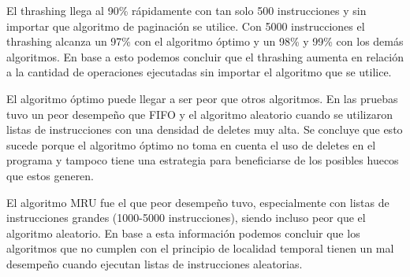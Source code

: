 \documentclass{report}
\begin{document}
El thrashing llega al 90\% rápidamente con tan solo 500 instrucciones y sin importar que algoritmo de paginación se utilice.  Con 5000 instrucciones el thrashing alcanza un 97\% con el algoritmo óptimo y un 98\% y 99\% con los demás algoritmos. En base a esto podemos concluir que el thrashing aumenta en relación a la cantidad de operaciones ejecutadas sin importar el algoritmo que se utilice.

El algoritmo óptimo puede llegar a ser peor que otros algoritmos. En las pruebas tuvo un peor desempeño que FIFO y el algoritmo aleatorio cuando se utilizaron listas de instrucciones con una densidad de deletes muy alta. Se concluye que esto sucede porque el algoritmo óptimo no toma en cuenta el uso de deletes en el programa y tampoco tiene una estrategia para beneficiarse de los posibles huecos que estos generen.

El algoritmo MRU fue el que peor desempeño tuvo, especialmente con listas de instrucciones grandes (1000-5000 instrucciones), siendo incluso peor que el algoritmo aleatorio. En base a esta información podemos concluir que los algoritmos que no cumplen con el principio de localidad temporal tienen un mal desempeño cuando ejecutan listas de instrucciones aleatorias.



%

\end{document}
